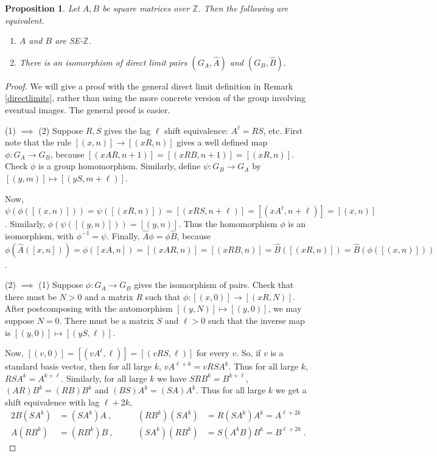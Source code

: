 \documentclass{amsart}
\newcommand{\si}{\index}
\newtheorem{prop}[equation]{Proposition}
\theoremstyle{definition}
\theoremstyle{definition}
\newcommand{\Z}{\mathbb Z}
\numberwithin{equation}{subsection}
\begin{document}
\begin{prop}  \label{seandpairiso}
Let $A,B$ be square  matrices over $\Z$.
Then the following are equivalent.
\begin{enumerate}
\item
$A$ and $B$ are SE-$\Z$.
\item
There is an isomorphism of direct limit pairs $(G_A, \hat A)$
and $(G_B, \hat B)$.
\end{enumerate}
\end{prop}
\begin{proof}
We will give a proof
with the general  direct limit definition
in Remark \ref{directlimits}, rather than using
the more concrete version of the group
involving eventual images. The general proof is easier.

(1) $\implies $ (2) Suppose $R,S$ gives the lag\si{lag} $\ell$ shift equivalence\si{shift equivalence}:
$A^{\ell}=RS$, etc. First note that the rule
$[(x,n)]\to [(xR,n)]$ gives a well defined map
$\phi: G_A \to G_B$, because
$ [(xAR,n+1)] =[ (xRB, n+1)] = [(xR,n)]$.
Check $\phi$ is a group homomorphism.
Similarly, define $\psi :G_B \to G_A$ by
$[(y, m)]\mapsto [(yS,m+\ell)]$.

Now, $\psi (\phi ([(x,n)])) = \psi ([(xR,n)])
=[(xRS,n+\ell)] = [(xA^{\ell}, n+\ell)] = [(x,n)]$.
Similarly,
$\phi (\psi ([(y,n)])) = [(y,n)]$.
Thus the homomorphism $\phi$ is an isomorphism,
with $\phi^{-1}=\psi$. Finally, $\widehat A \phi = \phi \widehat B$,
because
$\phi(\widehat A([x,n])) = \phi ([xA,n]) =
[(xAR,n)] = [(xRB,n)] = \widehat B([(xR,n)]) =
\widehat B(\phi ([(x,n)]))$. 


(2) $\implies $ (1)
Suppose $\phi : G_A \to G_B$ gives the isomorphism of pairs.
Check that there must be $N >0$ and a matrix $R$ such that
$\phi: [(x,0)]\to [(xR, N)]$. After postcomposing with the
automorphism
$[(y,N)]\mapsto [(y,0)]$, we may suppose $N=0$.
There must be a matrix $S$ and $\ell >0$ such that the inverse map is
$[(y,0)] \mapsto [(yS, \ell )]$.


Now, $[(v,0)]=[(vA^{\ell},\ell)]=[(vRS,\ell)]$ for every $v$.
  So, if $v$ is a standard
basis vector, then for all large $k$,
$vA^{\ell +k}= vRSA^k$. Thus for all large $k$, $RSA^k = A^{k+\ell}$.
Similarly, for all large $k$ we have
$SRB^k= B^{k+\ell}$, $(AR)B^k = (RB)B^k$ and $(BS)A^k = (SA)A^k$.
Thus for all large $k$ we get a shift equivalence with lag $\ell+2k$,
\begin{alignat*}{2}
  B(SA^k) &= (SA^k)A \ ,\qquad &
  (RB^k)(SA^k) &= R(SA^k)A^k =A^{\ell +2k} \\
  A(RB^k)  &= (RB^k)B \ , \qquad  &
  (SA^k)(RB^k) &= S(A^kB)B^k = B^{\ell +2k} \ .
 \end{alignat*}
\end{proof}
\end{document}
